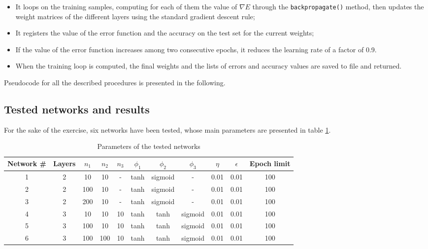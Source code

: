 \documentclass[letterpaper,headings=standardclasses]{scrartcl}
\begin{document}
\begin{itemize}
\begin{itemize}
        \item It loops on the training samples, computing for each of them the value of $\nabla E$ through the \texttt{backpropagate()} method, then updates the weight matrices of the different layers using the standard gradient descent rule;
        
        \item It registers the value of the error function and the accuracy on the test set for the current weights;
        
        \item If the value of the error function increases among two consecutive epochs, it reduces the learning rate of a factor of 0.9.
        
        \item When the training loop is computed, the final weights and the lists of errors and accuracy values are saved to file and returned.

    \end{itemize}

\end{itemize}

Pseudocode for all the described procedures is presented in the following.

\subsection{Tested networks and results}

For the sake of the exercise, six networks have been tested, whose main parameters are presented in table \ref{net_params}.

\begin{table}[h]
    \centering
    \begin{tabular}{|c|c|c|c|c|c|c|c|c|c|c|}
    \hline
    Network \# & Layers & $n_1$ & $n_2$ & $n_3$ & $\phi_1$ & $\phi_2$ & $\phi_3$ & $\eta$ & $\epsilon$ & Epoch limit \\ \hline
    1 & 2 & 10 & 10 & - & tanh & sigmoid & - & 0.01 & 0.01 & 100 \\ \hline
    2 & 2 & 100 & 10 & - & tanh & sigmoid & - & 0.01 & 0.01 & 100 \\ \hline
    3 & 2 & 200 & 10 & - & tanh & sigmoid & - & 0.01 & 0.01 & 100 \\ \hline
    4 & 3 & 10 & 10 & 10 & tanh & tanh & sigmoid & 0.01 & 0.01 & 100 \\ \hline
    5 & 3 & 100 & 10 & 10 & tanh & tanh & sigmoid & 0.01 & 0.01 & 100 \\ \hline
    6 & 3 & 100 & 100 & 10 & tanh & tanh & sigmoid & 0.01 & 0.01 & 100 \\ \hline
    \end{tabular}
    \caption{Parameters of the tested networks}
    \label{net_params}
\end{table}
\end{document}
